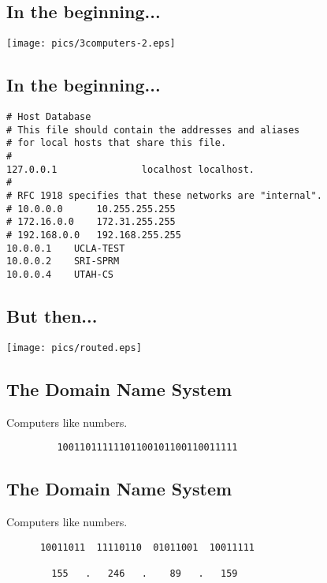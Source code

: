 \documentclass[xga]{xdvislides}
\begin{document}
\subsection{In the beginning...}
\vspace*{\fill}
\begin{center}
	\texttt{[image: pics/3computers-2.eps]} \\
\end{center}
\vspace*{\fill}

\subsection{In the beginning...}
\begin{verbatim}
# Host Database
# This file should contain the addresses and aliases
# for local hosts that share this file.
#
127.0.0.1               localhost localhost.
#
# RFC 1918 specifies that these networks are "internal".
# 10.0.0.0      10.255.255.255
# 172.16.0.0    172.31.255.255
# 192.168.0.0   192.168.255.255
10.0.0.1	UCLA-TEST
10.0.0.2	SRI-SPRM
10.0.0.4	UTAH-CS
\end{verbatim}


\subsection{But then...}
\vspace*{\fill}
\begin{center}
	\texttt{[image: pics/routed.eps]} \\
\end{center}
\vspace*{\fill}

\subsection{The Domain Name System}
\vspace{.5in}
\begin{center}
	\Huge
	Computers like numbers. \\
\vspace{.5in}
\begin{verbatim}
         10011011111101100101100110011111
\end{verbatim}
\end{center}
\Normalsize

\subsection{The Domain Name System}
\vspace{.5in}
\begin{center}
	\Huge
	Computers like numbers. \\
\vspace{.5in}
\begin{verbatim}
      10011011  11110110  01011001  10011111

        155   .   246   .    89   .   159
\end{verbatim}
\end{center}
\Normalsize
\end{document}
